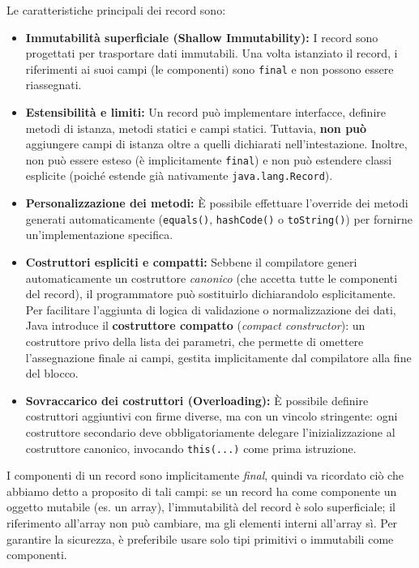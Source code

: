 Le caratteristiche principali dei record sono:
\begin{itemize}
    \item \textbf{Immutabilità superficiale (Shallow Immutability):} I record sono progettati per trasportare dati immutabili. Una volta istanziato il record, i riferimenti ai suoi campi (le componenti) sono \texttt{final} e non possono essere riassegnati.
    \item \textbf{Estensibilità e limiti:} Un record può implementare interfacce, definire metodi di istanza, metodi statici e campi statici. Tuttavia, \textbf{non può} aggiungere campi di istanza oltre a quelli dichiarati nell'intestazione. Inoltre, non può essere esteso (è implicitamente \texttt{final}) e non può estendere classi esplicite (poiché estende già nativamente \texttt{java.lang.Record}).
    \item \textbf{Personalizzazione dei metodi:} È possibile effettuare l'override dei metodi generati automaticamente (\texttt{equals()}, \texttt{hashCode()} o \texttt{toString()}) per fornirne un'implementazione specifica.
    \item \textbf{Costruttori espliciti e compatti:} Sebbene il compilatore generi automaticamente un costruttore \textit{canonico} (che accetta tutte le componenti del record), il programmatore può sostituirlo dichiarandolo esplicitamente. Per facilitare l'aggiunta di logica di validazione o normalizzazione dei dati, Java introduce il \textbf{costruttore compatto} (\textit{compact constructor}): un costruttore privo della lista dei parametri, che permette di omettere l'assegnazione finale ai campi, gestita implicitamente dal compilatore alla fine del blocco. 
    \item \textbf{Sovraccarico dei costruttori (Overloading):} È possibile definire costruttori aggiuntivi con firme diverse, ma con un vincolo stringente: ogni costruttore secondario deve obbligatoriamente delegare l'inizializzazione al costruttore canonico, invocando \texttt{this(...)} come prima istruzione.
\end{itemize}

\begin{warningbox}
    I componenti di un record sono implicitamente \textit{final}, quindi va ricordato ciò che abbiamo detto a proposito di tali campi: se un record ha come componente un oggetto mutabile (es. un array), l'immutabilità del record è solo superficiale; il riferimento all'array non può cambiare, ma gli elementi interni all'array sì. Per garantire la sicurezza, è preferibile usare solo tipi primitivi o immutabili come componenti.
\end{warningbox}


